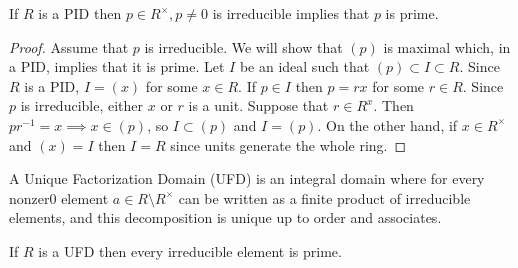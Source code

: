 \begin{proposition}
If $R$ is a PID then $p \in R^\times, p \not= 0$ is irreducible implies that $p$ is prime.
\end{proposition}

\begin{proof}
Assume that $p$ is irreducible. We will show that $(p)$ is maximal which, in a PID, implies that it is prime. Let $I$ be an ideal such that $(p) \subset I \subset R$. Since $R$ is a PID, $I = (x)$ for some $x \in R$. If $p \in I$ then $p = rx$ for some $r \in R$. Since $p$ is irreducible, either $x$ or $r$ is a unit. Suppose that $r \in R^x$. Then $pr^{-1} = x \implies x \in (p)$, so $I \subset (p)$ and $I = (p)$. On the other hand, if $x \in R^\times$ and $(x) = I$ then $I = R$ since units generate the whole ring.
\end{proof}

\begin{definition}
A Unique Factorization Domain (UFD) is an integral domain where for every nonzer0 element $a \in R \setminus R^\times$ can be written as a finite product of irreducible elements, and this decomposition is unique up to order and associates.
\end{definition}

\begin{example}
\end{example}

\begin{proposition}
If $R$ is a UFD then every irreducible element is prime.
\end{proposition}

